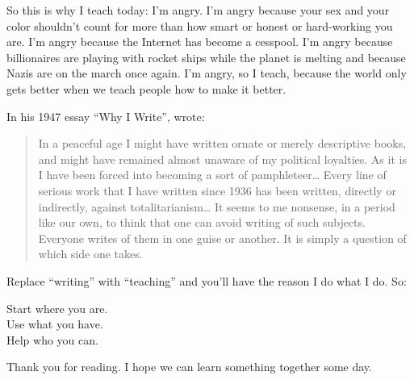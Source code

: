 So this is why I teach today:
I'm angry.
I'm angry because your sex and your color shouldn't count
for more than how smart or honest or hard-working you are.
I'm angry because the Internet has become a cesspool.
I'm angry because billionaires are playing with rocket ships while the planet is melting
and because Nazis are on the march once again.
I'm angry,
so I teach,
because the world only gets better when we teach people how to make it better.

In his 1947 essay ``Why I Write'',
 wrote:

\begin{quote}

  In a peaceful age I might have written ornate or merely descriptive books,
  and might have remained almost unaware of my political loyalties.
  As it is I have been forced into becoming a sort of pamphleteer{\ldots}
  Every line of serious work that I have written since 1936 has been written,
  directly or indirectly,
  against totalitarianism{\ldots}
  It seems to me nonsense,
  in a period like our own,
  to think that one can avoid writing of such subjects.
  Everyone writes of them in one guise or another.
  It is simply a question of which side one takes.

\end{quote}

\noindent
Replace ``writing'' with ``teaching'' and you'll have the reason I do what I do.
So:

\begin{center}

Start where you are.\\
Use what you have.\\
Help who you can.

\end{center}

\noindent
Thank you for reading.
I hope we can learn something together some day.

